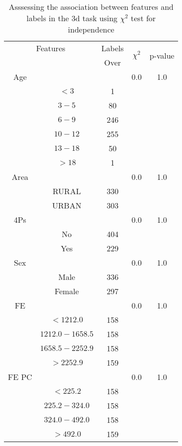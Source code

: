 \begin{table}[!htb]
\centering
\caption{Asssessing the association between features and labels in the 3d task using $\chi^2$ test for independence}
\label{tab:chitest_3d}
\begin{tabular}{c c | c| c | c}
\hline
\multicolumn{2}{c|}{Features}& \multicolumn{1}{c|}{Labels}& \multirow{2}{*}{$\chi^2$} & \multirow{2}{*}{p-value}\\ 
& & Over & & \\ 
\hline
Age &  & & 0.0 & 1.0 \\ 
& $< 3$ & 1& & \\ 
& $3-5$ & 80& & \\ 
& $6-9$ & 246& & \\ 
& $10-12$ & 255& & \\ 
& $13-18$ & 50& & \\ 
& $> 18$ & 1& & \\ 
\hline 
Area &  & & 0.0 & 1.0 \\ 
& RURAL & 330& & \\ 
& URBAN & 303& & \\ 
\hline 
4Ps &  & & 0.0 & 1.0 \\ 
& No & 404& & \\ 
& Yes & 229& & \\ 
\hline 
Sex &  & & 0.0 & 1.0 \\ 
& Male & 336& & \\ 
& Female & 297& & \\ 
\hline 
FE &  & & 0.0 & 1.0 \\ 
& $< 1212.0$ & 158& & \\ 
& $1212.0-1658.5$ & 158& & \\ 
& $1658.5-2252.9$ & 158& & \\ 
& $> 2252.9$ & 159& & \\ 
\hline 
FE PC &  & & 0.0 & 1.0 \\ 
& $< 225.2$ & 158& & \\ 
& $225.2-324.0$ & 158& & \\ 
& $324.0-492.0$ & 158& & \\ 
& $> 492.0$ & 159& & \\ 
\hline 
\end{tabular}
\end{table}
